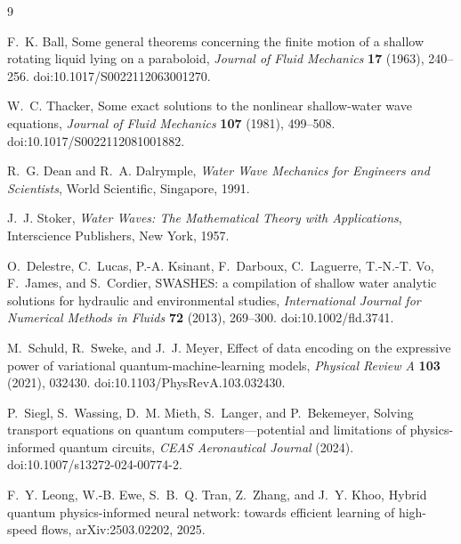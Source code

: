 \documentclass[11pt]{article}
\begin{document}
\begin{thebibliography}{9}

F.~K. Ball,
Some general theorems concerning the finite motion of a shallow rotating liquid lying on a paraboloid,
\textit{Journal of Fluid Mechanics} \textbf{17} (1963), 240--256.
doi:10.1017/S0022112063001270.

W.~C. Thacker,
Some exact solutions to the nonlinear shallow-water wave equations,
\textit{Journal of Fluid Mechanics} \textbf{107} (1981), 499--508.
doi:10.1017/S0022112081001882.

R.~G. Dean and R.~A. Dalrymple,
\textit{Water Wave Mechanics for Engineers and Scientists},
World Scientific, Singapore, 1991.

J.~J. Stoker,
\textit{Water Waves: The Mathematical Theory with Applications},
Interscience Publishers, New York, 1957.

O.~Delestre, C.~Lucas, P.-A. Ksinant, F.~Darboux, C.~Laguerre,
T.-N.-T. Vo, F.~James, and S.~Cordier,
SWASHES: a compilation of shallow water analytic solutions for hydraulic and environmental studies,
\textit{International Journal for Numerical Methods in Fluids} \textbf{72} (2013), 269--300.
doi:10.1002/fld.3741.

M.~Schuld, R.~Sweke, and J.~J. Meyer,
Effect of data encoding on the expressive power of variational quantum-machine-learning models,
\textit{Physical Review A} \textbf{103} (2021), 032430.
doi:10.1103/PhysRevA.103.032430.

P.~Siegl, S.~Wassing, D.~M. Mieth, S.~Langer, and P.~Bekemeyer,
Solving transport equations on quantum computers---potential and limitations of physics-informed quantum circuits,
\textit{CEAS Aeronautical Journal} (2024).
doi:10.1007/s13272-024-00774-2.

F.~Y. Leong, W.-B. Ewe, S.~B.~Q. Tran, Z.~Zhang, and J.~Y. Khoo,
Hybrid quantum physics-informed neural network: towards efficient learning of high-speed flows,
arXiv:2503.02202, 2025.

\end{thebibliography}
\end{document}
